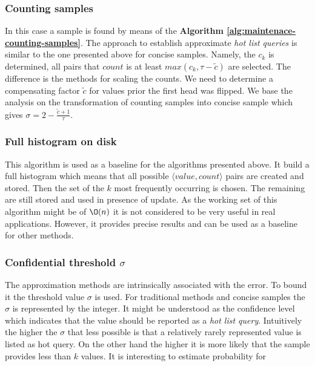 \subsubsection{Counting samples}
In this case a sample is found by means of the \textbf{Algorithm
  \ref{alg:maintenace-counting-samples}}. The approach to establish
approximate \textit{hot list queries} is similar to the
one presented above for concise samples. Namely, the $c_k$ is
determined, all pairs that $count$ is at least $max(c_k, \tau - \widetilde{c})$ are
selected. The difference is the methods for scaling the counts.
We need to determine a compensating factor $\widetilde{c}$ for values
prior the first head was flipped. We base the analysis on the
transformation of counting samples into concise sample which gives
$\sigma = 2 - \frac{\widetilde{c}+1}{\tau}$.


\subsubsection{Full histogram on disk}
This algorithm is used as a baseline for the algorithms presented
above. It build a full histogram which means that all possible
$\langle value, count \rangle$ pairs are created and stored. Then the
set of the $k$ most frequently occurring is chosen. The remaining are
still stored and used in presence of update. As the working set of
this algorithm might be of $\O(n)$ it is not considered to be
very useful in real applications. However, it provides precise results
and can be used as a baseline for other methods.

\subsubsection{Confidential threshold $\sigma$}
The approximation methods are intrinsically associated with the
error. To bound it the threshold value $\sigma$ is used. For
traditional methods and concise samples the $\sigma$ is represented by
the integer. It might be understood as the confidence level which
indicates that the value should be reported as a \textit{hot list
  query}. Intuitively the higher the $\sigma$ that less possible is
that a relatively rarely represented value is listed as hot query. On
the other hand the higher it is more likely that the sample provides
less than $k$ values. It is interesting to estimate probability for 